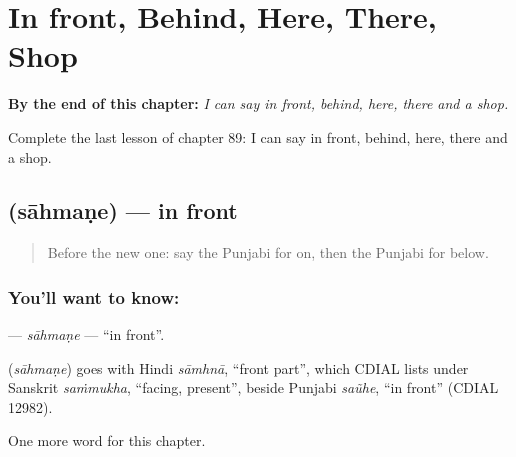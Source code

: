 
\chapter{In front, Behind, Here, There, Shop}
\label{ch:pa-in-front-behind-here-there-shop}

\begin{chapteropening}
\textbf{By the end of this chapter:} \emph{I can say in front, behind, here, there and a shop.}

Complete the last lesson of chapter 89: I can say in front, behind, here, there and a shop.
\end{chapteropening}

\section[\texorpdfstring{\pa{ਸਾਹਮਣੇ} (sāhmaṇe)}{ਸਾਹਮਣੇ (sāhmaṇe)}]{ (sāhmaṇe) — in front}

\label{lesson:PA-C89-sahmane}



\begin{quote}
Before the new one: say the Punjabi for on, then the Punjabi for below.
\end{quote}

\subsection*{You'll want to know: }
\textbf{} — \emph{sāhmaṇe} — \textquotedblleft{}in front\textquotedblright{}.

\begin{cousinweb}
\textbf{} (\emph{sāhmaṇe}) goes with Hindi \emph{sāmhnā}, \textquotedblleft{}front part\textquotedblright{}, which CDIAL lists under Sanskrit \emph{saṁmukha}, \textquotedblleft{}facing, present\textquotedblright{}, beside Punjabi \emph{saũhe}, \textquotedblleft{}in front\textquotedblright{} (CDIAL 12982).
\end{cousinweb}

\begin{grammarlens}[title={What you've built}]
One more word for this chapter.
\end{grammarlens}

